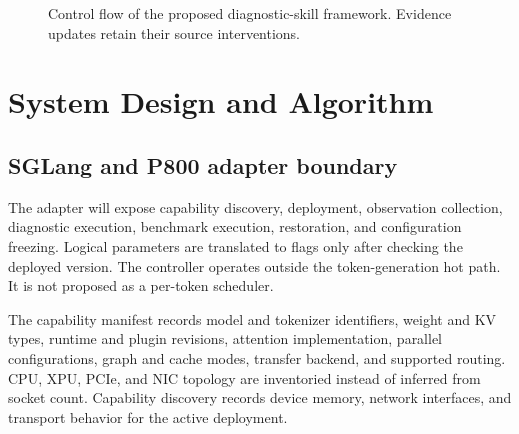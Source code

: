 \documentclass[preprint,12pt]{elsarticle}
\begin{document}
\begin{figure}[t]
\centering
{}
\caption{Control flow of the proposed diagnostic-skill framework. Evidence updates retain their source interventions.}
\label{fig:architecture}
\end{figure}

\section{System Design and Algorithm}
\subsection{SGLang and P800 adapter boundary}
The adapter will expose capability discovery, deployment, observation collection, diagnostic execution, benchmark execution, restoration, and configuration freezing. Logical parameters are translated to flags only after checking the deployed version. The controller operates outside the token-generation hot path. It is not proposed as a per-token scheduler.

The capability manifest records model and tokenizer identifiers, weight and KV types, runtime and plugin revisions, attention implementation, parallel configurations, graph and cache modes, transfer backend, and supported routing. CPU, XPU, PCIe, and NIC topology are inventoried instead of inferred from socket count. Capability discovery records device memory, network interfaces, and transport behavior for the active deployment.
\end{document}
